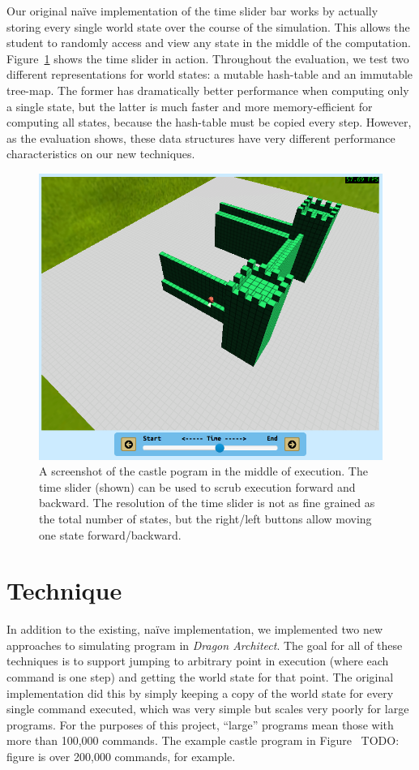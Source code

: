 \documentclass{sig-alternate}
\newcommand{\da}{\emph{Dragon Architect}}
\newcommand{\todo}[1]{{\color{red} TODO: #1}}
\begin{document}
Our original na\"{i}ve implementation of the time slider bar works by actually storing every single world state over the course of the simulation. This allows the student to randomly access and view any state in the middle of the computation. Figure~\ref{fig:time-slider} shows the time slider in action. Throughout the evaluation, we test two different representations for world states: a mutable hash-table and an immutable tree-map. The former has dramatically better performance when computing only a single state, but the latter is much faster and more memory-efficient for computing all states, because the hash-table must be copied every step. However, as the evaluation shows, these data structures have very different performance characteristics on our new techniques.

\begin{figure}[ht!]
  \centering
  \includegraphics[width=0.9\columnwidth]{images/castle-time-slider}
  \caption{A screenshot of the castle pogram in the middle of execution. The time slider (shown) can be used to scrub execution forward and backward. The resolution of the time slider is not as fine grained as the total number of states, but the right/left buttons allow moving one state forward/backward.}
  \label{fig:time-slider}
\end{figure}

\section{Technique} 

In addition to the existing, na\"{i}ve implementation, we implemented two new approaches to simulating program in \da. The goal for all of these techniques is to support jumping to arbitrary point in execution (where each command is one step) and getting the world state for that point. The original implementation did this by simply keeping a copy of the world state for every single command executed, which was very simple but scales very poorly for large programs. For the purposes of this project, ``large'' programs mean those with more than 100,000 commands. The example castle program in Figure~\todo{figure} is over 200,000 commands, for example.
\end{document}
